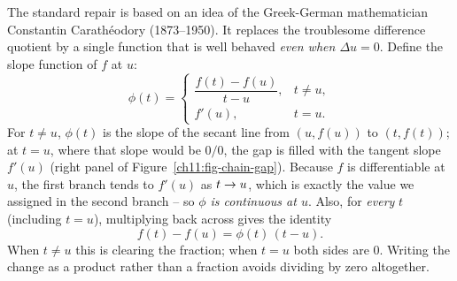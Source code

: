 The standard repair is based on an idea of the Greek-German mathematician Constantin
Carath\'eodory (1873--1950). It replaces the troublesome difference quotient by a single
function that is well behaved \emph{even when $\Delta u = 0$}. Define the slope
function of $f$ at $u$:
\[
  \phi(t) =
  \begin{cases}
    \dfrac{f(t)-f(u)}{t-u}, & t\ne u,\\[1.0em]
    f'(u), & t = u.
  \end{cases}
\]
For $t\ne u$, $\phi(t)$ is the slope of the secant line from $(u,f(u))$ to $(t,f(t))$;
at $t=u$, where that slope would be $0/0$, the gap is filled with the tangent slope
$f'(u)$ (right panel of Figure~\ref{ch11:fig-chain-gap}).
Because $f$ is differentiable at $u$, the first branch tends to $f'(u)$ as $t\to u$, which
is exactly the value we assigned in the second branch -- so \emph{$\phi$ is continuous at
$u$}. Also, for \emph{every} $t$ (including $t=u$), multiplying back across gives the
identity
\[
  f(t)-f(u) = \phi(t)\,(t-u).
\]
When $t\ne u$ this is clearing the fraction; when $t=u$ both sides are $0$.
Writing the change as a product rather than a fraction avoids dividing by zero altogether.


